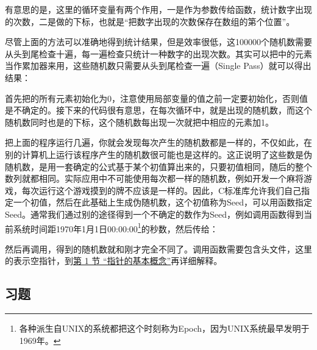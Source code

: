 

有意思的是，这里的循环变量有两个作用，一是作为参数传给函数，统计数字出现的次数，二是做的下标，也就是“把数字出现的次数保存在数组的第个位置”。



尽管上面的方法可以准确地得到统计结果，但是效率很低，这100000个随机数需要从头到尾检查十遍，每一遍检查只统计一种数字的出现次数。其实可以把中的元素当作累加器来用，这些随机数只需要从头到尾检查一遍（Single Pass）就可以得出结果：




首先把的所有元素初始化为0，注意使用局部变量的值之前一定要初始化，否则值是不确定的。接下来的代码很有意思，在每次循环中，就是出现的随机数，而这个随机数同时也是的下标，这个随机数每出现一次就把中相应的元素加1。



把上面的程序运行几遍，你就会发现每次产生的随机数都是一样的，不仅如此，在别的计算机上运行该程序产生的随机数很可能也是这样的。这正说明了这些数是伪随机数，是用一套确定的公式基于某个初值算出来的，只要初值相同，随后的整个数列就都相同。实际应用中不可能使用每次都一样的随机数，例如开发一个麻将游戏，每次运行这个游戏摸到的牌不应该是一样的。因此，C标准库允许我们自己指定一个初值，然后在此基础上生成伪随机数，这个初值称为Seed，可以用函数指定Seed。通常我们通过别的途径得到一个不确定的数作为Seed，例如调用函数得到当前系统时间距1970年1月1日00:\BookSplit{}00:\BookSplit{}00\footnote[18]{各种派生自UNIX的系统都把这个时刻称为Epoch，因为UNIX系统最早发明于1969年。}的秒数，然后传给：




然后再调用，得到的随机数就和刚才完全不同了。调用函数需要包含头文件，这里的表示空指针，到\hyperlink{db.ch23s01.id2809880}{第 1 节 “指针的基本概念”}再详细解释。


\subsection*{习题}
%


